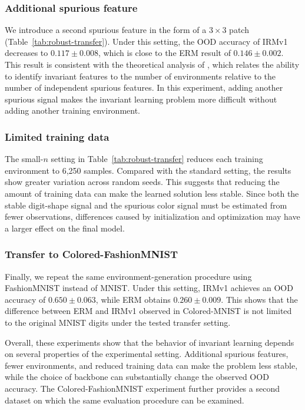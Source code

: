 \documentclass[12pt,a4paper]{article}
\begin{document}
\subsubsection{Additional spurious feature}
We introduce a second spurious feature in the form of a $3\times3$ patch
(Table~\ref{tab:robust-transfer}).
Under this setting, the OOD accuracy of IRMv1 decreases to
$0.117\pm0.008$, which is close to the ERM result of $0.146\pm0.002$.
This result is consistent with the theoretical analysis of
\citet{rosenfeld2021risks}, which relates the ability to identify invariant features
to the number of environments relative to the number of independent spurious
features. In this experiment, adding another spurious signal makes the invariant
learning problem more difficult without adding another training environment.

\subsubsection{Limited training data}
The small-$n$ setting in Table~\ref{tab:robust-transfer} reduces each training
environment to 6,250 samples. Compared
with the standard setting, the results show greater variation across random seeds.
This suggests that reducing the amount of training data can make the learned solution
less stable. Since both the stable digit-shape signal and the spurious color signal
must be estimated from fewer observations, differences caused by initialization and
optimization may have a larger effect on the final model.

\subsubsection{Transfer to Colored-FashionMNIST}
Finally, we repeat the same environment-generation procedure using FashionMNIST
instead of MNIST. Under this setting, IRMv1 achieves an OOD accuracy of
$0.650\pm0.063$, while ERM obtains $0.260\pm0.009$. This shows that the difference
between ERM and IRMv1 observed in Colored-MNIST is not limited to the original MNIST
digits under the tested transfer setting.

Overall, these experiments show that the behavior of invariant learning depends on
several properties of the experimental setting. Additional spurious features, fewer
environments, and reduced training data can make the problem less stable, while the
choice of backbone can substantially change the observed OOD accuracy. The
Colored-FashionMNIST experiment further provides a second dataset on which the same
evaluation procedure can be examined.
\end{document}
